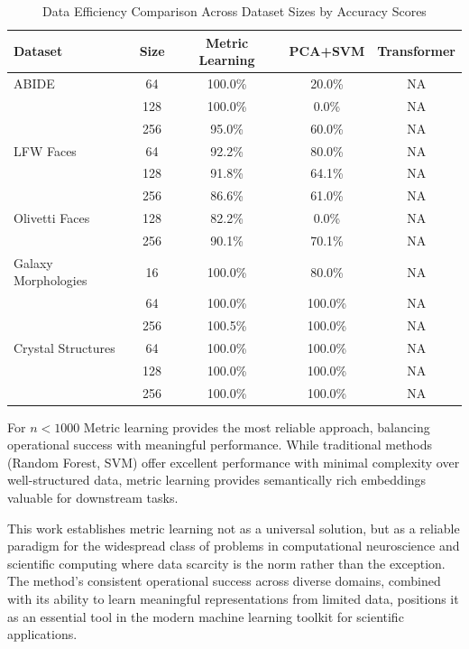 \documentclass[a4paper,12pt,reqno]{amsart}
\theoremstyle{definition}
\theoremstyle{remark}
\begin{document}
\begin{table}[htbp]
	\centering
	\caption{Data Efficiency Comparison Across Dataset Sizes by Accuracy Scores}
	\label{tab:data_efficiency}
	\begin{tabular}{lcccc}
		\hline
		\textbf{Dataset} & \textbf{Size} & \textbf{Metric Learning} &  \textbf{PCA+SVM}& \textbf{Transformer}  \\
		\hline
		ABIDE  & 64& 100.0\%  & 20.0\%& NA  \\
		& 128 & 100.0\%  & 0.0\%& NA  \\
		& 256 & 95.0\%  & 60.0\% & NA \\
		\hline
		LFW Faces & 64 & 92.2\% & 80.0\% & NA  \\
		& 128 & 91.8\%  & 64.1\% & NA\\
		& 256 & 86.6\%  & 61.0\% & NA \\
		\hline
		Olivetti Faces & 128 & 82.2\% & 0.0\%&NA   \\
		& 256 & 90.1\%  & 70.1\% & NA\\
		\hline
		Galaxy Morphologies & 16 & 100.0\% & 80.0\% & NA \\
		& 64 & 100.0\% & 100.0\% & NA  \\
		& 256 & 100.5\%  & 100.0\% & NA \\
		\hline
		Crystal Structures& 64& 100.0\%  & 100.0\% & NA \\
		& 128 & 100.0\%  & 100.0\%& NA \\
		& 256 & 100.0\%  & 100.0\% & NA \\
		\hline
		\hline
	\end{tabular}
\end{table}







For $n < 1000$ Metric learning provides the most reliable approach, balancing operational success with meaningful performance. While traditional methods (Random Forest, SVM) offer excellent performance with minimal complexity over well-structured data, metric learning provides semantically rich embeddings valuable for downstream tasks.

This work establishes metric learning not as a universal solution, but as a reliable paradigm for the widespread class of problems in computational neuroscience and scientific computing where data scarcity is the norm rather than the exception. The method's consistent operational success across diverse domains, combined with its ability to learn meaningful representations from limited data, positions it as an essential tool in the modern machine learning toolkit for scientific applications.
\end{document}
